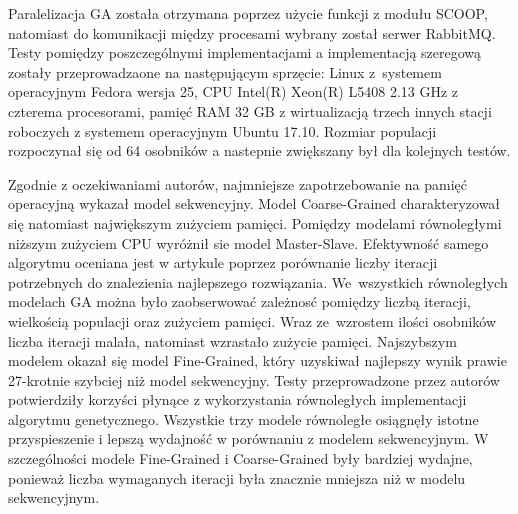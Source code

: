 \documentclass[12pt]{article}
\begin{document}
Paralelizacja GA została otrzymana poprzez użycie funkcji z modułu SCOOP, natomiast do komunikacji między procesami wybrany został serwer RabbitMQ. Testy pomiędzy poszczególnymi
implementacjami a implementacją szeregową zostały przeprowadzaone na następującym sprzęcie: Linux z~systemem operacyjnym Fedora wersja 25, CPU Intel(R) Xeon(R) L5408
2.13 GHz z czterema procesorami, pamięć RAM 32 GB z wirtualizacją trzech innych stacji roboczych z systemem operacyjnym Ubuntu 17.10. Rozmiar populacji rozpoczynał się od 64 osobników
a nastepnie zwiększany był dla kolejnych testów.

Zgodnie z oczekiwaniami autorów, najmniejsze zapotrzebowanie na pamięć operacyjną wykazał model sekwencyjny. Model Coarse-Grained charakteryzował się natomiast największym
zużyciem pamięci. Pomiędzy modelami równoległymi niższym zużyciem CPU wyróżnił sie model Master-Slave. Efektywność samego algorytmu oceniana jest w artykule poprzez porównanie
liczby iteracji potrzebnych do znalezienia najlepszego rozwiązania. We~wszystkich równoległych modelach GA można było zaobserwować zależnosć pomiędzy liczbą iteracji, wielkością
populacji oraz zużyciem pamięci. Wraz ze~wzrostem ilości osobników liczba iteracji malała, natomiast wzrastało zużycie pamięci. Najszybszym modelem okazał się model Fine-Grained,
który uzyskiwał najlepszy wynik prawie 27-krotnie szybciej niż model sekwencyjny. Testy przeprowadzone przez autorów potwierdziły korzyści płynące z wykorzystania równoległych
implementacji algorytmu genetycznego. Wszystkie trzy modele równoległe osiągnęły istotne przyspieszenie i lepszą wydajność w porównaniu z modelem sekwencyjnym. W szczególności
modele Fine-Grained i Coarse-Grained były bardziej wydajne, ponieważ liczba wymaganych iteracji była znacznie mniejsza niż w modelu sekwencyjnym.
\end{document}

